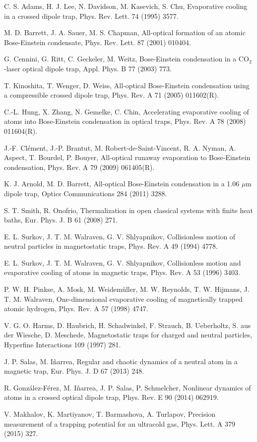 \documentclass[pra,letterpaper,onecolumn,superscriptaddress,floatfix]{revtex4}
\begin{document}
\begin{thebibliography}{99}
 C. S. Adams, H. J. Lee, N. Davidson, M. Kasevich, S. Chu,
Evaporative cooling in a crossed dipole trap,
Phys. Rev. Lett. 74 (1995) 3577.

 M. D. Barrett, J. A. Sauer, M. S. Chapman, 
All-optical formation of an atomic Bose-Einstein condensate,
Phys. Rev. Lett. 87 (2001) 010404.

 G. Cennini, G. Ritt, C. Geckeler, M. Weitz,
Bose-Einstein condensation in a CO${}_2$-laser optical dipole trap, 
Appl. Phys. B 77 (2003) 773.

 T. Kinoshita, T. Wenger, D. Weiss, 
All-optical Bose-Einstein condensation using a compressible crossed dipole trap,
Phys. Rev. A 71 (2005) 011602(R).

 C.-L. Hung, X. Zhang, N. Gemelke, C. Chin,
Accelerating evaporative cooling of atoms into Bose-Einstein condensation in optical traps,
Phys. Rev. A 78 (2008) 011604(R).

 J.-F. Cl\'ement, J.-P. Brantut, M. Robert-de-Saint-Vincent, R. A. Nyman, 
A. Aspect, T. Bourdel, P. Bouyer,
All-optical runaway evaporation to Bose-Einstein condensation,
Phys. Rev. A 79 (2009) 061405(R).

 K. J. Arnold, M. D. Barrett,
All-optical Bose-Einstein condensation in a 1.06 $\mu$m dipole trap, 
Optics Communications 284 (2011) 3288.

 S. T. Smith, R. Onofrio, 
Thermalization in open classical systems with finite heat baths,
Eur. Phys. J. B 61 (2008) 271.

 E. L. Surkov, J. T. M. Walraven, G. V. Shlyapnikov,
Collisionless motion of neutral particles in magnetostatic traps,
Phys. Rev. A 49 (1994) 4778.

 E. L. Surkov, J. T. M. Walraven, G. V. Shlyapnikov,
Collisionless motion and evaporative cooling of atoms in magnetic traps,
Phys. Rev. A 53 (1996) 3403.

 P. W. H. Pinkse, A. Mosk, M. Weidem\"uller, M. W. Reynolds, T. W. Hijmans, J. T. M. Walraven,
One-dimensional evaporative cooling of magnetically trapped atomic hydrogen,
Phys. Rev. A 57 (1998) 4747.

 V. G. O. Harms, D. Haubrich, H. Schadwinkel, F. Strauch, B. Ueberholtz, S. aus der Wiesche,  D. Meschede, 
Magnetostatic traps for charged and neutral particles,
Hyperfine Interactions 109 (1997) 281.

 J. P. Salas, M. I\~narrea,
Regular and chaotic dynamics of a neutral atom in a magnetic trap,
Eur. Phys. J. D 67 (2013) 248.

 R. Gonz\'alez-F\'erez, M. I\~narrea, J. P. Salas, P. Schmelcher,
Nonlinear dynamics of atoms in a crossed optical dipole trap,
Phys. Rev. E 90 (2014) 062919.

 V. Makhalov, K. Martiyanov, T. Barmashova, A. Turlapov,
Precision measurement of a trapping potential for an ultracold gas,
Phys. Lett. A 379 (2015) 327.

\end{thebibliography}
\end{document}
